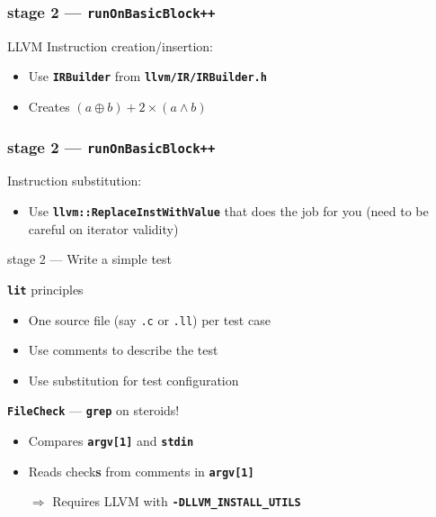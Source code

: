 \documentclass[14pt]{beamer}
\newcommand{\Command}[1]{\textbf{\texttt{#1}}}
\newcommand{\Code}[1]{\textbf{\texttt{#1}}}
\begin{document}
    \begin{frame}[containsverbatim]
    \frametitle{stage 2 --- \texttt{runOnBasicBlock++}}
    LLVM Instruction creation/insertion:
    \begin{itemize}
		\item Use \Code{IRBuilder} from \Code{llvm/IR/IRBuilder.h}
		\item Creates $(a \oplus b) + 2 \times (a \wedge b)$ 
    \end{itemize}
    \hspace{-2em}%
    \begin{minipage}{\textwidth}
        \footnotesize
        
    \end{minipage}
    \end{frame}

    \begin{frame}[containsverbatim]
    \frametitle{stage 2 --- \texttt{runOnBasicBlock++}}
    Instruction substitution:
    \begin{itemize}
		\item Use \Code{llvm::ReplaceInstWithValue} that does the job for you
			(need to be careful on iterator validity)
    \end{itemize}
    \begin{minipage}{\textwidth}
        \footnotesize
        
    \end{minipage}
    \end{frame}

    \begin{frame}{stage 2 --- Write a simple test}
        \begin{alertblock}{\Command{lit} principles}
            \begin{itemize}
                \item One source file (say \texttt{.c} or \texttt{.ll}) per test case
                \item Use comments to describe the test
                \item Use substitution for test configuration
            \end{itemize}
        \end{alertblock}

        \begin{block}{\Command{FileCheck} --- \Command{grep} on steroids!}
            \begin{itemize}
                \item Compares \Code{argv[1]} and \Code{stdin}
                \item Reads check\textbf{s} from comments in \Code{argv[1]}
                \item[$\Rightarrow$] Requires LLVM with \Code{-DLLVM\_INSTALL\_UTILS}
            \end{itemize}
        \end{block}
    \end{frame}
\end{document}
